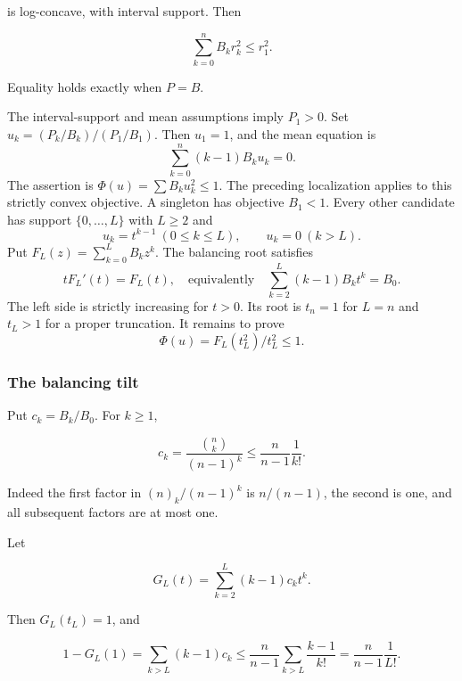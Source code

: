 \documentclass[11pt,a4paper]{article}
\theoremstyle{definition}
\theoremstyle{remark}
\begin{document}
is log-concave, with interval support. Then

\begin{equation}\label{eq:m-1}
\boxed{\ \sum_{k=0}^nB_kr_k^2\le r_1^2.\ }
\end{equation}

Equality holds exactly when \(P=B\).

The interval-support and mean assumptions imply \(P_1>0\). Set
\(u_k=(P_k/B_k)/(P_1/B_1)\). Then \(u_1=1\), and the mean equation is \begin{equation}\label{eq:m-4}
\sum_{k=0}^n(k-1)B_ku_k=0.
\end{equation} The assertion is \(\Phi(u)=\sum B_ku_k^2\le1\). The preceding
localization applies to this strictly convex objective. A singleton has
objective \(B_1<1\). Every other candidate has support
\(\{0,\ldots,L\}\) with \(L\ge2\) and \begin{equation}\label{eq:m-6}
u_k=t^{k-1}\ (0\le k\le L),\qquad u_k=0\ (k>L).
\end{equation} Put \(F_L(z)=\sum_{k=0}^LB_kz^k\). The balancing root satisfies \begin{equation}\label{eq:m-7}
tF_L'(t)=F_L(t),\quad\text{equivalently}\quad
 \sum_{k=2}^L(k-1)B_kt^k=B_0.
\end{equation} The left side is strictly increasing for \(t>0\). Its root is
\(t_n=1\) for \(L=n\) and \(t_L>1\) for a proper truncation. It remains
to prove \begin{equation}\label{eq:m-8}
\Phi(u)=F_L(t_L^2)/t_L^2\le1.
\end{equation} \subsubsection{The balancing tilt}

Put \(c_k=B_k/B_0\). For \(k\ge1\),

\begin{equation}\label{eq:m-9}
c_k=\frac{\binom nk}{(n-1)^k}
\le\frac{n}{n-1}\frac1{k!}.
\end{equation}

Indeed the first factor in \((n)_k/(n-1)^k\) is \(n/(n-1)\), the second
is one, and all subsequent factors are at most one.

Let

\[
G_L(t)=\sum_{k=2}^L(k-1)c_kt^k.
\]

Then \(G_L(t_L)=1\), and

\[
1-G_L(1)=\sum_{k>L}(k-1)c_k
\le\frac{n}{n-1}\sum_{k>L}\frac{k-1}{k!}
=\frac{n}{n-1}\frac1{L!}.
\]
\end{document}
